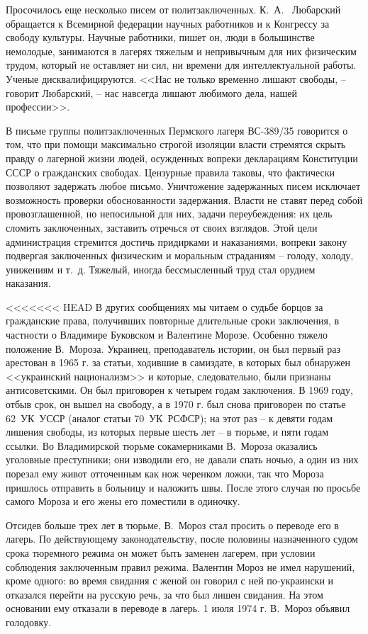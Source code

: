 \documentclass{book}
\begin{document}
Просочилось еще несколько писем от политзаключенных. К.~А.~	Любарский обращается к Всемирной федерации научных работников и к Конгрессу за свободу культуры. Научные работники, пишет он, люди в большинстве немолодые, занимаются в лагерях тяжелым и непривычным для них физическим трудом, который не оставляет ни сил, ни времени для интеллектуальной работы. Ученые дисквалифицируются. <<Нас не только временно лишают свободы, -- говорит Любарский, -- нас навсегда лишают любимого дела, нашей профессии>>.

В письме группы политзаключенных Пермского лагеря ВС-389/35 говорится о том, что при помощи максимально строгой изоляции власти стремятся скрыть правду о лагерной жизни людей, осужденных вопреки декларациям Конституции СССР о гражданских свободах. Цензурные правила таковы, что фактически позволяют задержать любое письмо. Уничтожение задержанных писем исключает возможность проверки обоснованности задержания. Власти не ставят перед собой провозглашенной, но непосильной для них, задачи переубеждения: их цель   сломить заключенных, заставить отречься от своих взглядов. Этой цели администрация стремится достичь придирками и наказаниями, вопреки закону подвергая заключенных физическим и моральным страданиям -- голоду, холоду, унижениям и т.~д. Тяжелый, иногда бессмысленный труд стал орудием наказания.

<<<<<<< HEAD
В других сообщениях мы читаем о судьбе борцов за гражданские права, получивших повторные длительные сроки заключения, в частности о Владимире Буковском и Валентине Морозе. Особенно тяжело положение В.~Мороза. Украинец, преподаватель истории, он был первый раз арестован в 1965 г. за статьи, ходившие в самиздате, в которых был обнаружен <<украинский национализм>> и которые, следовательно, были признаны антисоветскими. Он был приговорен к четырем годам заключения. В 1969 году, отбыв срок, он вышел на свободу, а в 1970 г. был снова приговорен по статье 62~УК~УССР (аналог статьи 70~УК~РСФСР); на этот раз -- к девяти годам лишения свободы, из которых первые шесть лет -- в тюрьме, и пяти годам ссылки. Во Владимирской тюрьме сокамерниками В.~Мо­роза оказались уголовные преступники; они изводили его, не давали спать ночью, а один из них порезал ему живот отточенным как нож черенком ложки, так что Мороза пришлось отпра­вить в больницу и наложить швы. После этого случая по просьбе самого Мороза и его жены его поместили в одиночку.

Отсидев больше трех лет в тюрьме, В.~Мороз стал просить о переводе его в лагерь. По действующему законодательству, после половины назначенного судом срока тюремного режима он может быть заменен лагерем, при условии соблюдения заключенным правил режима. Валентин Мороз не имел нарушений, кроме одного: во время свидания с женой он говорил с ней по‑украински и отказался перейти на русскую речь, за что был лишен свидания. На этом основании ему отказали в переводе в лагерь. 1 июля 1974 г. В.~Мороз объявил голодовку.
\end{document}
